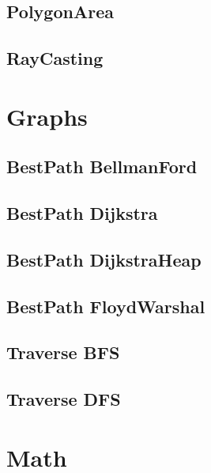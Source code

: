 \subsection{ PolygonArea}
\raggedbottom
\hrulefill
\subsection{ RayCasting}
\raggedbottom
\hrulefill

\section{Graphs}
\subsection{BestPath BellmanFord}
\raggedbottom
\hrulefill
\subsection{BestPath Dijkstra}
\raggedbottom
\hrulefill
\subsection{BestPath DijkstraHeap}
\raggedbottom
\hrulefill
\subsection{BestPath FloydWarshal}
\raggedbottom
\hrulefill
\subsection{Traverse BFS}
\raggedbottom
\hrulefill
\subsection{Traverse DFS}
\raggedbottom
\hrulefill

\section{Math}
